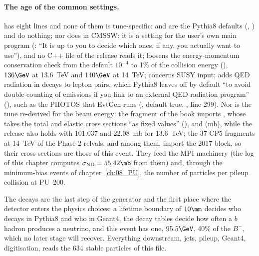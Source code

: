 \paragraph{The age of the common settings.}
 has eight lines and none of them is tune-specific: 
and  are the Pythia8 defaults (,
) and do nothing; nor does  in CMSSW: it is a setting for
the user's own main program (: ``It is up to you to decide which ones, if any, you
actually want to use''), and no C++ file of the release reads it;  loosens the
energy-momentum conservation check from the default $10^{-4}$ to 1\% of the collision energy (),
$136\GeV$ at 13.6~TeV and $140\GeV$ at 14~TeV;  concerns SUSY input;
 adds QED radiation in decays to lepton pairs, which Pythia8 leaves off
by default ``to avoid double-counting of emissions if you link to an external QED-radiation program''
(), such as the PHOTOS that EvtGen runs (, default true,
, line 299). Nor is the tune re-derived for the beam energy: the fragment of the book imports
, whose  takes the
total and elastic cross sections ``as fixed values'' (),  and
 (mb), while the release also holds  with
101.037 and 22.08~mb for 13.6~TeV; the 37 CP5 fragments at 14~TeV of the Phase-2 relvals,  and
 among them, import the 2017 block, so their cross sections are those of this event. They feed the MPI
machinery (the log of this chapter computes $\sigma_{\mathrm{ND}} = 55.42\mb$ from them) and, through the minimum-bias
events of chapter~\ref{ch:08_PU}, the number of particles per pileup collision at PU~200.

\begin{plainwords}
The decays are the last step of the generator and the first place where the detector enters the physics choices:
a lifetime boundary of $10\mm$ decides who decays in Pythia8 and who in Geant4, the decay tables decide how often
a $b$ hadron produces a neutrino, and this event has one, $95.5\GeV$, 40\% of the $B^-$, which no later
stage will recover. Everything downstream, jets, pileup, Geant4, digitisation, reads the 634 stable particles of
this file.
\end{plainwords}
